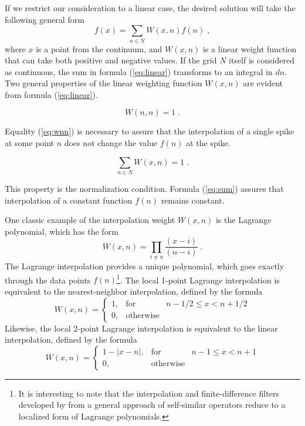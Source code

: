 If we restrict our consideration to a linear case, the desired
solution will take the following general form
\begin{equation}\label{eq:linear}
  f (x) = \sum_{n \in N} W (x, n) f (n)\;,
\end{equation}
where $x$ is a point from the continuum, and $W (x, n)$ is a linear
weight function that can take both positive and negative values. If
the grid $N$ itself is considered as continuous, the sum in formula
(\ref{eq:linear}) transforms to an integral in $dn$. Two general
properties of the linear weighting function $W (x, n)$ are evident
from formula (\ref{eq:linear}).
\begin{property} 
\begin{equation}\label{eq:wnn}
  W (n, n) = 1\;.
\end{equation}
\end{property}
Equality (\ref{eq:wnn}) is necessary to assure that the interpolation
of a single spike at some point $n$ does not change the value $f (n)$
at the spike. 
\begin{property}
\begin{equation}\label{eq:sum}
  \sum_{n \in N} W (x, n) = 1\;.
\end{equation}
\end{property}
This property is the normalization condition. Formula (\ref{eq:sum})
assures that interpolation of a constant function $f(n)$ remains
constant.

One classic example of the interpolation weight $W (x, n)$ is the
Lagrange polynomial, which has the form
\begin{equation}\label{eq:lagrange}
  W (x, n) = \prod_{i \neq n} \frac{(x-i)}{(n-i)}\;.
\end{equation}
The Lagrange interpolation provides a unique polynomial, which goes
exactly through the data points $f (n)$\footnote{It is interesting to
note that the interpolation and finite-difference filters developed
by \cite{Karrenbach.sepphd.83} from a general approach of
self-similar operators reduce to a localized form of Lagrange
polynomials.}. The local 1-point Lagrange interpolation is equivalent
to the nearest-neighbor interpolation, defined by the formula
\begin{equation}\label{eq:bin}
  W (x, n) = \left\{\begin{array}{lcr}
1, & \mbox{for} & n - 1/2 \leq x < n + 1/2 \\
0, & \mbox{otherwise} &
\end{array}\right.
\end{equation}
Likewise, the local 2-point Lagrange interpolation is equivalent
to the linear interpolation, defined by the formula
\begin{equation}\label{eq:lin}
  W (x, n) = \left\{\begin{array}{lcr}
1 - |x-n|, & \mbox{for} & n - 1 \leq x < n + 1 \\
0, & \mbox{otherwise} &
\end{array}\right.
\end{equation}

